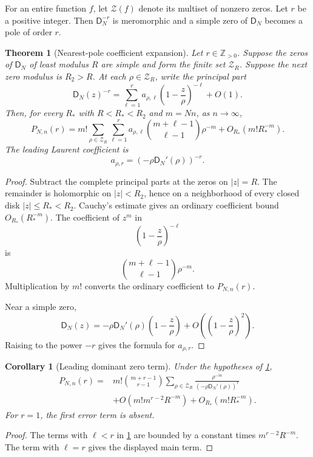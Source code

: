 \documentclass[11pt]{article}
\newtheorem{theorem}{Theorem}[section]
\newtheorem{corollary}[corollary]{Corollary}
\theoremstyle{definition}
\theoremstyle{remark}
\newcommand{\ZZ}{\mathbb Z}
\newcommand{\Zcal}{\mathcal Z}
\newcommand{\Dfun}{\mathsf D}
\begin{document}
For an entire function $f$, let $\Zcal(f)$ denote its multiset of nonzero zeros.  Let $r$ be a positive integer.  Then $\Dfun_N^{-r}$ is meromorphic and a simple zero of $\Dfun_N$ becomes a pole of order $r$.

\begin{theorem}[Nearest-pole coefficient expansion]\label{thm:nearest_circle_expansion}
Let $r\in\ZZ_{>0}$.  Suppose the zeros of $\Dfun_N$ of least modulus
$R$ are simple and form the finite set $\Zcal_R$.  Suppose the next
zero modulus is $R_2>R$.  At each $\rho\in\Zcal_R$, write the principal
part
\[
\Dfun_N(z)^{-r}
=
\sum_{\ell=1}^{r}
 a_{\rho,\ell}
\left(1-\frac z\rho\right)^{-\ell}
+
O(1).
\]
Then, for every $R_*$ with $R<R_*<R_2$ and $m=Nn$, as $n\to\infty$,
\[
P_{N,n}(r)
=
 m!
\sum_{\rho\in\Zcal_R}
\sum_{\ell=1}^{r}
 a_{\rho,\ell}
\binom{m+\ell-1}{\ell-1}
\rho^{-m}
+
O_{R_*}(m!R_*^{-m}).
\]
The leading Laurent coefficient is
\[
a_{\rho,r}
=
(-\rho\Dfun_N'(\rho))^{-r}.
\]
\end{theorem}

\begin{proof}
Subtract the complete principal parts at the zeros on $|z|=R$.  The remainder is holomorphic on $|z|<R_2$, hence on a neighborhood of every closed disk $|z|\leq R_*<R_2$.  Cauchy's estimate gives an ordinary coefficient bound $O_{R_*}(R_*^{-m})$.  The coefficient of $z^m$ in
\[
\left(1-\frac z\rho\right)^{-\ell}
\]
is
\[
\binom{m+\ell-1}{\ell-1}\rho^{-m}.
\]
Multiplication by $m!$ converts the ordinary coefficient to $P_{N,n}(r)$.

Near a simple zero,
\[
\Dfun_N(z)
=
-\rho\Dfun_N'(\rho)
\left(1-\frac z\rho\right)
+O\left(\left(1-\frac z\rho\right)^2\right).
\]
Raising to the power $-r$ gives the formula for $a_{\rho,r}$.
\end{proof}

\begin{corollary}[Leading dominant zero term]\label{cor:leading_dominant_zero}
Under the hypotheses of \cref{thm:nearest_circle_expansion},
\[
\begin{aligned}
P_{N,n}(r)
={}&m!\binom{m+r-1}{r-1}
\sum_{\rho\in\Zcal_R}
\frac{\rho^{-m}}{(-\rho\Dfun_N'(\rho))^r}
\\
&+O\left(m!m^{r-2}R^{-m}\right)
+O_{R_*}\left(m!R_*^{-m}\right).
\end{aligned}
\]
For $r=1$, the first error term is absent.
\end{corollary}

\begin{proof}
The terms with $\ell<r$ in \cref{thm:nearest_circle_expansion} are bounded by a constant times $m^{r-2}R^{-m}$.  The term with $\ell=r$ gives the displayed main term.
\end{proof}
\end{document}
